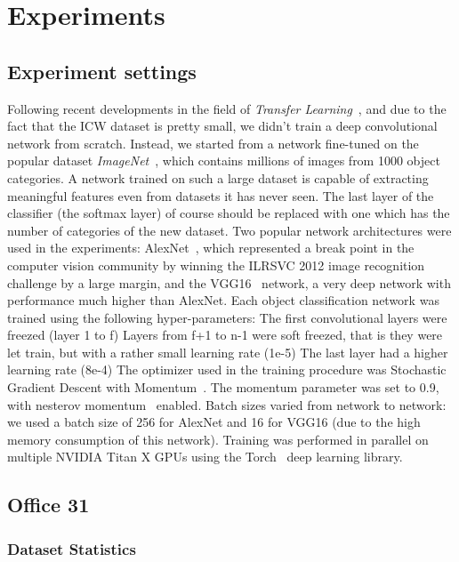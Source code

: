 \documentclass[../main.tex]{subfiles}
\begin{document}
    \chapter{Experiments}\label{chap:experiments}

    \section{Experiment settings}
    Following recent developments in the field of \textit{Transfer Learning}~\cite{transfer-learning}, and due to the fact that
    the ICW dataset is pretty small, we didn't train a deep convolutional network from scratch. Instead, we started from a network
    fine-tuned on the popular dataset \textit{ImageNet}~\cite{imagenet}, which contains millions of images from 1000 object categories.
    A network trained on such a large dataset is capable of extracting meaningful features even from datasets it has never seen.
    The last layer of the classifier (the softmax layer) of course should be replaced with one which has the number of categories of the new dataset.
    Two popular network architectures were used in the experiments: AlexNet~\cite{alexnet}, which represented a break point in the computer vision
    community by winning the ILRSVC 2012 image recognition challenge by a large margin, and the VGG16~\cite{vgg16} network, a very deep network
    with performance much higher than AlexNet.
    Each object classification network was trained using the following hyper-parameters:
    The first convolutional layers were freezed (layer 1 to f)
    Layers from f+1 to n-1 were soft freezed, that is they were let train, but with a rather small learning rate (1e-5)
    The last layer had a higher learning rate (8e-4)
    The optimizer used in the training procedure was Stochastic Gradient Descent with Momentum~\cite{momentum}. The momentum parameter
    was set to 0.9, with nesterov momentum~\cite{nesterov-momentum} enabled.
    Batch sizes varied from network to network: we used a batch size of 256 for AlexNet and 16 for VGG16 (due to the high memory
    consumption of this network).
    Training was performed in parallel on multiple NVIDIA Titan X GPUs using the Torch~\cite{torch7} deep learning library.

    \section{Office 31}
    \subsection{Dataset Statistics}
\end{document}
